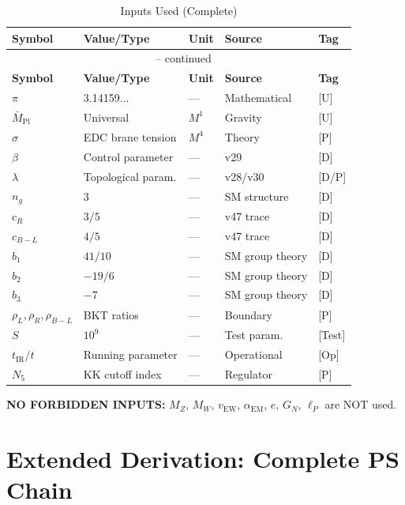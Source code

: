 \documentclass[11pt,a4paper]{article}
\theoremstyle{definition}
\begin{document}
\begin{longtable}{@{}lllll@{}}
\caption{Inputs Used (Complete)} \label{tab:inputs_complete} \\
\toprule
\textbf{Symbol} & \textbf{Value/Type} & \textbf{Unit} & \textbf{Source} & \textbf{Tag} \\
\midrule
\endfirsthead
\multicolumn{5}{c}{{\tablename\ \thetable{} -- continued}} \\
\toprule
\textbf{Symbol} & \textbf{Value/Type} & \textbf{Unit} & \textbf{Source} & \textbf{Tag} \\
\midrule
\endhead
\bottomrule
\endfoot
$\pi$ & 3.14159... & --- & Mathematical & [U] \\
$\bar{M}_{\text{Pl}}$ & Universal & $M^1$ & Gravity & [U] \\
$\sigma$ & EDC brane tension & $M^4$ & Theory & [P] \\
$\beta$ & Control parameter & --- & v29 & [D] \\
$\lambda$ & Topological param. & --- & v28/v30 & [D/P] \\
$n_g$ & 3 & --- & SM structure & [D] \\
$c_R$ & $3/5$ & --- & v47 trace & [D] \\
$c_{B-L}$ & $4/5$ & --- & v47 trace & [D] \\
$b_1$ & $41/10$ & --- & SM group theory & [D] \\
$b_2$ & $-19/6$ & --- & SM group theory & [D] \\
$b_3$ & $-7$ & --- & SM group theory & [D] \\
$\rho_L, \rho_R, \rho_{B-L}$ & BKT ratios & --- & Boundary & [P] \\
$S$ & $10^9$ & --- & Test param. & [Test] \\
$t_{\text{IR}}/t$ & Running parameter & --- & Operational & [Op] \\
$N_5$ & KK cutoff index & --- & Regulator & [P] \\
\end{longtable}

\textbf{NO FORBIDDEN INPUTS:} $M_Z$, $M_W$, $v_{\text{EW}}$, $\alpha_{\text{EM}}$, $e$, $G_N$, $\ell_P$ are NOT used.

\section{Extended Derivation: Complete PS Chain}
\label{app:ps_chain}
\end{document}
